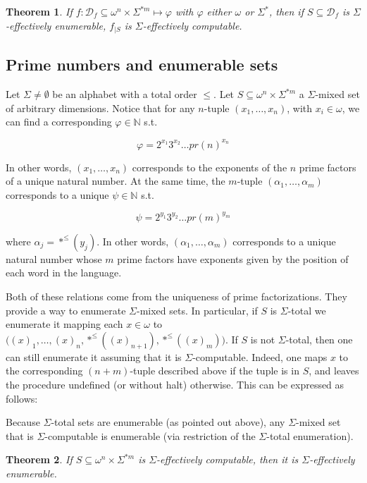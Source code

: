 \documentclass[a4paper, 12pt]{article}
\newtheorem{theorem}{Theorem}
\newtheorem{theorem}{Theorem}
\begin{document}
\begin{theorem}
    If $f : \mathcal{D}_f \subseteq \omega^{n} \times \Sigma^{*m} \mapsto
    \varphi$ with $\varphi$ either $\omega$ or $\Sigma^{*}$, then if $S
    \subseteq \mathcal{D}_f$ is $\Sigma$-effectively enumerable, $f_{| S}$ is
    $\Sigma$-effectively computable.
\end{theorem}



\subsection{Prime numbers and enumerable sets}

Let $\Sigma \neq \emptyset$ be an alphabet with a total order $\leq$. Let $S
\subseteq \omega^{n} \times \Sigma^{*m}$ a $\Sigma$-mixed set of arbitrary
dimensions. Notice that for any $n$-tuple $(x_1, \ldots, x_n)$, with $x_i \in
\omega$, we can find a corresponding $\varphi \in \mathbb{N}$ s.t. 

$$
\varphi = 2^{x_1}3^{x_2} \ldots pr(n)^{x_n}
$$

In other words, $(x_1, \ldots, x_n)$ corresponds to the exponents of the $n$
prime factors of a unique natural number. At the same time, the $m$-tuple
$(\alpha_1, \ldots, \alpha_m)$ corresponds to a unique $\psi \in \mathbb{N}$
s.t. 

$$
\psi = 2^{y_1}3^{y_2}\ldots pr(m)^{y_m}
$$

where $\alpha_j = *^{\leq}(y_j)$. In other words, $(\alpha_1, \ldots, \alpha_m)$
corresponds to a unique natural number whose $m$ prime factors have exponents
given by the position of each word in the language.

Both of these relations come from the uniqueness of prime factorizations.
They provide a way to enumerate $\Sigma$-mixed sets. In
particular, if $S$ is $\Sigma$-total we enumerate it mapping each $x \in \omega$
to $\big((x)_1, \ldots, (x)_n, *^{\leq}((x)_{n+1}), *^{\leq}((x)_m)\big)$. If
$S$ is not $\Sigma$-total, then one can still enumerate it assuming that it is
$\Sigma$-computable. Indeed, one maps $x$ to the corresponding $(n+m)$-tuple
described above if the tuple is in $S$, and leaves the procedure undefined (or
without halt) otherwise. This can be expressed as follows:

Because $\Sigma$-total sets are enumerable (as pointed out above), any
$\Sigma$-mixed set that is $\Sigma$-computable is enumerable (via restriction
of the $\Sigma$-total enumeration).

\begin{theorem}
    If $S \subseteq \omega^{n} \times \Sigma^{*m} $ is $\Sigma$-effectively
    computable, then it is $\Sigma$-effectively enumerable.
\end{theorem}
\end{document}
